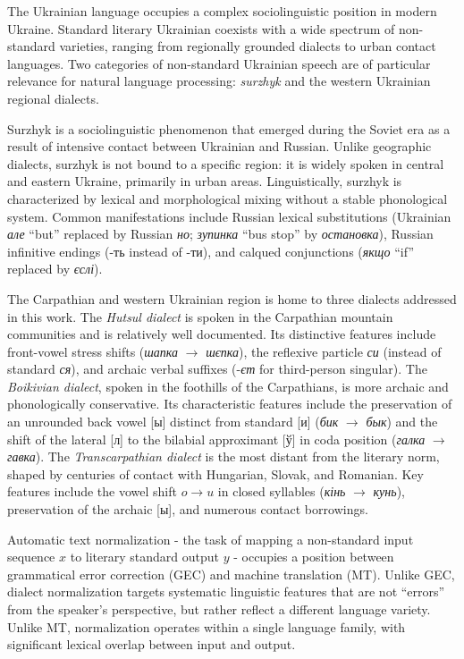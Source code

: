 \documentclass[14pt]{extarticle}
\begin{document}
The Ukrainian language occupies a complex sociolinguistic position in modern Ukraine. Standard
literary Ukrainian coexists with a wide spectrum of non-standard varieties, ranging from
regionally grounded dialects to urban contact languages. Two categories of non-standard Ukrainian
speech are of particular relevance for natural language processing: \textit{surzhyk} and the
western Ukrainian regional dialects.

Surzhyk is a sociolinguistic phenomenon that emerged during the Soviet era as a result of intensive
contact between Ukrainian and Russian. Unlike geographic dialects, surzhyk is not bound to a
specific region: it is widely spoken in central and eastern Ukraine, primarily in urban areas.
Linguistically, surzhyk is characterized by lexical and morphological mixing without a stable
phonological system. Common manifestations include Russian lexical substitutions (Ukrainian
\textit{але} ``but'' replaced by Russian \textit{но}; \textit{зупинка} ``bus stop'' by
\textit{остановка}), Russian infinitive endings (-ть instead of -ти), and calqued conjunctions
(\textit{якщо} ``if'' replaced by \textit{єслі}).

The Carpathian and western Ukrainian region is home to three dialects addressed in this work. The
\textit{Hutsul dialect} is spoken in the Carpathian mountain communities and is relatively well
documented. Its distinctive features include front-vowel stress shifts (\textit{шапка}
$\rightarrow$ \textit{шєпка}), the reflexive particle \textit{си} (instead of standard
\textit{ся}), and archaic verbal suffixes (-\textit{єт} for third-person singular). The
\textit{Boikivian dialect}, spoken in the foothills of the Carpathians, is more archaic and
phonologically conservative. Its characteristic features include the preservation of an unrounded
back vowel [ы] distinct from standard [и] (\textit{бик} $\rightarrow$ \textit{бык}) and the
shift of the lateral [л] to the bilabial approximant [ў] in coda position (\textit{галка}
$\rightarrow$ \textit{гавка}). The \textit{Transcarpathian dialect} is the most distant from the
literary norm, shaped by centuries of contact with Hungarian, Slovak, and Romanian. Key features
include the vowel shift $o \rightarrow u$ in closed syllables (\textit{кінь} $\rightarrow$
\textit{кунь}), preservation of the archaic [ы], and numerous contact borrowings.

Automatic text normalization - the task of mapping a non-standard input sequence $x$ to literary
standard output $y$ - occupies a position between grammatical error correction (GEC) and machine
translation (MT). Unlike GEC, dialect normalization targets systematic linguistic features that are
not ``errors'' from the speaker's perspective, but rather reflect a different language variety.
Unlike MT, normalization operates within a single language family, with significant lexical overlap
between input and output.
\end{document}
